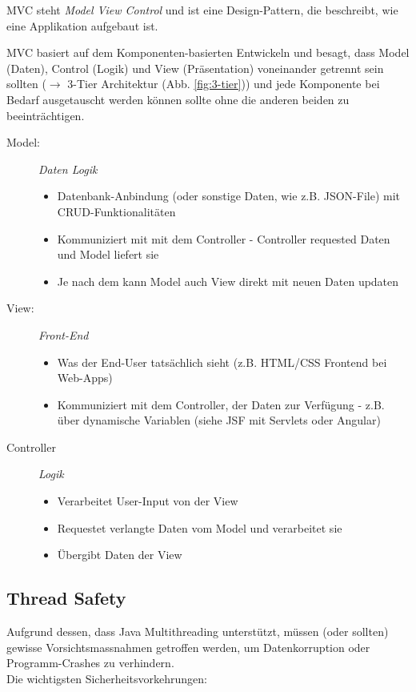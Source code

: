 \documentclass[a4paper, 11pt]{article}
\begin{document}
MVC steht \textit{Model View Control} und ist eine Design-Pattern, die beschreibt, wie eine Applikation aufgebaut ist. 

MVC basiert auf dem Komponenten-basierten Entwickeln und besagt, dass Model (Daten), Control (Logik) und View (Präsentation) voneinander getrennt sein sollten ($\rightarrow$ 3-Tier Architektur (Abb. \ref{fig:3-tier})) und jede Komponente bei Bedarf ausgetauscht werden können sollte ohne die anderen beiden zu beeinträchtigen.

\begin{description}
	\item[Model: ] \textit{Daten Logik}
	\begin{itemize}
		\item Datenbank-Anbindung (oder sonstige Daten, wie z.B. JSON-File) mit CRUD-Funktionalitäten
		\item Kommuniziert mit mit dem Controller - Controller requested Daten und Model liefert sie
		\item Je nach dem kann Model auch View direkt mit neuen Daten updaten
	\end{itemize}
	\item[View: ] \textit{Front-End}
	\begin{itemize}
		\item Was der End-User tatsächlich sieht (z.B. HTML/CSS Frontend bei Web-Apps)
		\item Kommuniziert mit dem Controller, der Daten zur Verfügung - z.B. über dynamische Variablen (siehe JSF mit Servlets oder Angular)
	\end{itemize}
	\item[Controller] \textit{Logik}
	\begin{itemize}
		\item Verarbeitet User-Input von der View
		\item Requestet verlangte Daten vom Model und verarbeitet sie
		\item Übergibt Daten der View
	\end{itemize}

\end{description}

\subsection{Thread Safety}
Aufgrund dessen, dass Java Multithreading unterstützt, müssen (oder sollten) gewisse Vorsichtsmassnahmen getroffen werden, um Datenkorruption oder Programm-Crashes zu verhindern. \\
Die wichtigsten Sicherheitsvorkehrungen:
\end{document}
